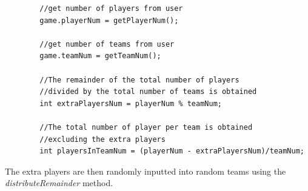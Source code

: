 \documentclass[a4paper,12pt]{extarticle}
\begin{document}
\newpage
\begin{lstlisting}
        //get number of players from user
        game.playerNum = getPlayerNum();

        //get number of teams from user
        game.teamNum = getTeamNum();

        //The remainder of the total number of players 
        //divided by the total number of teams is obtained
        int extraPlayersNum = playerNum % teamNum;

        //The total number of player per team is obtained 
        //excluding the extra players
        int playersInTeamNum = (playerNum - extraPlayersNum)/teamNum;

\end{lstlisting}
\vspace{4mm}

\noindent The extra players are then randomly inputted into random teams using the \textit{distributeRemainder} method.
\end{document}
